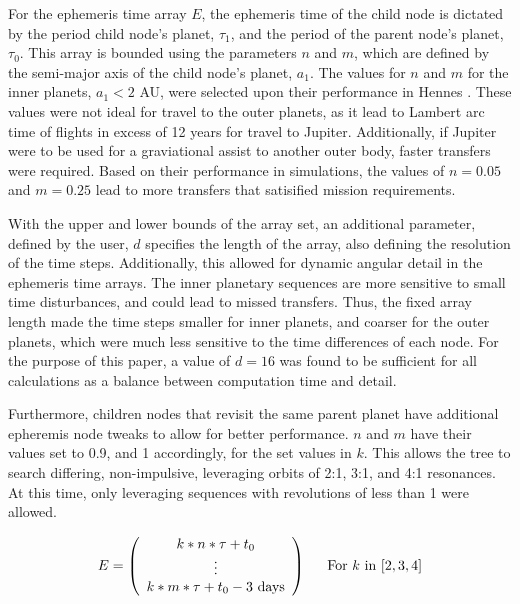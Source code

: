 \documentclass[letterpaper, preprint, paper,11pt]{AAS}	%
\begin{document}
For the ephemeris time array $E$, the ephemeris time of the child node is dictated by the period child node's planet, $\tau_1$, and the period of the parent node's planet, $\tau_0$. This array is bounded using the parameters $n$ and $m$, which are defined by the semi-major axis of the child node's planet, $a_1$. The values for $n$ and $m$ for the inner planets, $a_1 < 2$ AU, were selected upon their performance in Hennes \cite{Hennes2015}. These values were not ideal for travel to the outer planets, as it lead to Lambert arc time of flights in excess of 12 years for travel to Jupiter. Additionally, if Jupiter were to be used for a graviational assist to another outer body, faster transfers were required. Based on their performance in simulations, the values of $n = 0.05$ and $m = 0.25$ lead to more transfers that satisified mission requirements. %

With the upper and lower bounds of the array set, an additional parameter, defined by the user, $d$ specifies the length of the array, also defining the resolution of the time steps. Additionally, this allowed for dynamic angular detail in the ephemeris time arrays. The inner planetary sequences are more sensitive to small time disturbances, and could lead to missed transfers. Thus, the fixed array length made the time steps smaller for inner planets, and coarser for the outer planets, which were much less sensitive to the time differences of each node. For the purpose of this paper, a value of $d = 16$ was found to be sufficient for all calculations as a balance between computation time and detail. 

Furthermore, children nodes that revisit the same parent planet have additional epheremis node tweaks to allow for better performance. $n$ and $m$ have their values set to 0.9, and 1 accordingly, for the set values in $k$. This allows the tree to search differing, non-impulsive, leveraging orbits of 2:1, 3:1, and 4:1 resonances. At this time, only leveraging sequences with revolutions of less than 1 were allowed.

\begin{equation}
    \label{eq:ephemArrayLev}
    E = 
    \left(\begin{array}{c}
        k*n*\tau + t_0 \\ 
        \vdots \\
        k*m*\tau + t_0 - 3 \text{ days} \\
    \end{array}\right)\hspace{1.5em}
    \text{For } k \text{ in } [2, 3, 4]
\end{equation}
\end{document}
